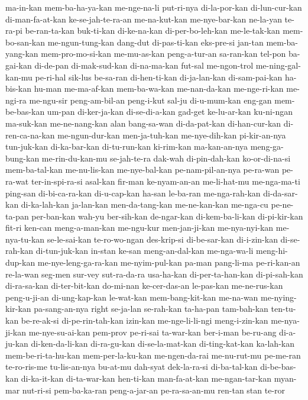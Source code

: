 {ma-in-kan mem-ba-ha-ya-kan me-nge-na-li put-ri-nya di-la-por-kan di-lun-cur-kan di-man-fa-at-kan ke-se-jah-te-ra-an
me-na-kut-kan me-nye-bar-kan ne-la-yan te-ra-pi be-ran-ta-kan buk-ti-kan di-ke-na-kan di-per-bo-leh-kan
me-le-tak-kan mem-bo-san-kan me-ngun-tung-kan dang-dut di-pas-ti-kan eks-pre-si jan-tan mem-ba-yang-kan
mem-pro-mo-si-kan me-mu-as-kan peng-a-tur-an sa-ran-kan tel-pon ba-gai-kan di-de-pan di-mak-sud-kan
di-na-ma-kan fut-sal me-ngon-trol me-ning-gal-kan-mu pe-ri-hal sik-lus be-sa-ran di-hen-ti-kan
di-ja-lan-kan di-sam-pai-kan ha-bis-kan hu-man me-ma-af-kan mem-ba-wa-kan me-nan-da-kan me-nge-ri-kan
me-ngi-ra me-ngu-sir peng-am-bil-an peng-i-kut sal-ju di-u-mum-kan eng-gan mem-be-bas-kan
um-pan di-ker-ja-kan di-se-di-a-kan gad-get ke-lu-ar-kan ku-ni-ngan ma-suk-kan me-ne-nang-kan
alan bang-sa-wan di-da-pat-kan di-han-cur-kan di-ren-ca-na-kan me-ngun-dur-kan men-ja-tuh-kan me-nye-dih-kan
pi-kir-an-nya tun-juk-kan di-ka-bar-kan di-tu-run-kan ki-rim-kan ma-kan-an-nya meng-ga-bung-kan me-rin-du-kan-mu
se-jah-te-ra dak-wah di-pin-dah-kan ko-or-di-na-si mem-ba-tal-kan me-nu-lis-kan me-nye-bal-kan pe-nam-pil-an-nya
pe-ra-wan pe-ra-wat ter-in-spi-ra-si asal-kan fir-man ke-nyam-an-an me-li-hat-mu me-nga-ma-ti
ping-san di-bi-ca-ra-kan di-u-cap-kan ha-san le-ba-ran me-nga-rah-kan di-da-sar-kan di-ka-lah-kan
ja-lan-kan men-da-tang-kan me-ne-kan-kan me-nga-cu pe-ne-ta-pan per-ban-kan wah-yu ber-sih-kan
de-ngar-kan di-kem-ba-li-kan di-pi-kir-kan fit-ri ken-can meng-a-man-kan me-ngu-kur men-jan-ji-kan
me-nya-nyi-kan me-nya-tu-kan se-le-sai-kan te-ro-wo-ngan des-krip-si di-be-sar-kan di-i-zin-kan di-se-rah-kan
di-tun-juk-kan in-stan ke-san meng-an-dal-kan me-nga-wa-li meng-hi-dup-kan me-nye-leng-ga-ra-kan me-nyim-pul-kan
pa-man pang-li-ma pe-ri-kan-an re-la-wan seg-men sur-vey sut-ra-da-ra usa-ha-kan
di-per-ta-han-kan di-pi-sah-kan di-ra-sa-kan di-ter-bit-kan do-mi-nan ke-cer-das-an le-pas-kan me-ne-rus-kan
peng-u-ji-an di-ung-kap-kan le-wat-kan mem-bang-kit-kan me-na-wan me-nying-kir-kan pa-sang-an-nya right
se-ja-lan se-rah-kan ta-ha-pan tam-bah-kan ten-tu-kan be-re-ak-si di-pe-rin-tah-kan izin-kan
me-nge-li-li-ngi meng-i-zin-kan me-nya-ji-kan me-nye-su-ai-kan pem-prov pe-ri-sai ta-war-kan ber-i-man
be-ru-ang di-a-ju-kan di-ken-da-li-kan di-ra-gu-kan di-se-la-mat-kan di-ting-kat-kan ka-lah-kan mem-be-ri-ta-hu-kan
mem-per-la-ku-kan me-ngen-da-rai me-nu-rut-mu pe-me-ran te-ro-ris-me tu-lis-an-nya bu-at-mu dah-syat
dek-la-ra-si di-ba-tal-kan di-be-bas-kan di-ka-it-kan di-ta-war-kan hen-ti-kan man-fa-at-kan me-ngan-tar-kan
myan-mar nut-ri-si pem-ba-ka-ran peng-a-jar-an pe-ra-sa-an-mu ren-tan stan te-ror
}
